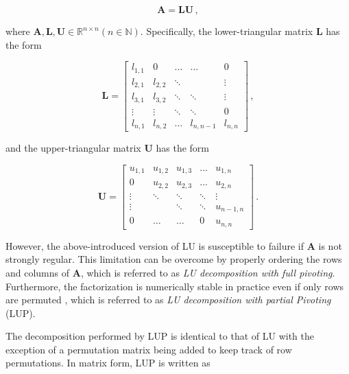 \begin{equation}
	\mathbf{A} = \mathbf{LU} \,,
\end{equation}

where $\mathbf{A},\mathbf{L},\mathbf{U} \in \mathbb{R}^{n\times n} \left( n \in \mathbb{N} \right)$.
Specifically, the lower-triangular matrix $\mathbf{L}$ has the form

\begin{equation}
	\mathbf{L} = {
		\begin{bmatrix}
			l_{1,1} & 0		  & \ldots & \ldots    & 0 		 \\
			l_{2,1} & l_{2,2} & \ddots & 		   & \vdots	 \\
			l_{3,1} & l_{3,2} & \ddots & \ddots	   & \vdots	 \\
			\vdots	& \vdots  & \ddots & \ddots    & 0		 \\
			l_{n,1} & l_{n,2} & \ldots & l_{n,n-1} & l_{n,n}
		\end{bmatrix}
	} \,,
\end{equation}

and the upper-triangular matrix $\mathbf{U}$ has the form

\begin{equation}
	\mathbf{U} = {
		\begin{bmatrix}
			u _{1,1} & u _{1,2} & u _{1,3} & \ldots & u _{1,n}   \\
			0 		 & u _{2,2} & u _{2,3} & \ldots & u _{2,n}   \\
			\vdots   & \ddots 	& \ddots   & \ddots & \vdots 	 \\
			\vdots   & 			& \ddots   & \ddots & u _{n-1,n} \\
			0 		 & \ldots	& \ldots   & 0 		& u _{n,n}
		\end{bmatrix}
	} \,.
\end{equation}

However, the above-introduced version of LU is susceptible to failure if $\mathbf{A}$ is not strongly regular.
This limitation can be overcome by properly ordering the rows and columns of $\mathbf{A}$, which is referred to as \textit{LU decomposition with full pivoting}.
Furthermore, the factorization is numerically stable in practice even if only rows are permuted \cite{Trefethen1997}, which is referred to as \textit{LU decomposition with partial Pivoting} (LUP).

The decomposition performed by LUP is identical to that of LU with the exception of a permutation matrix being added to keep track of row permutations.
In matrix form, LUP is written as

